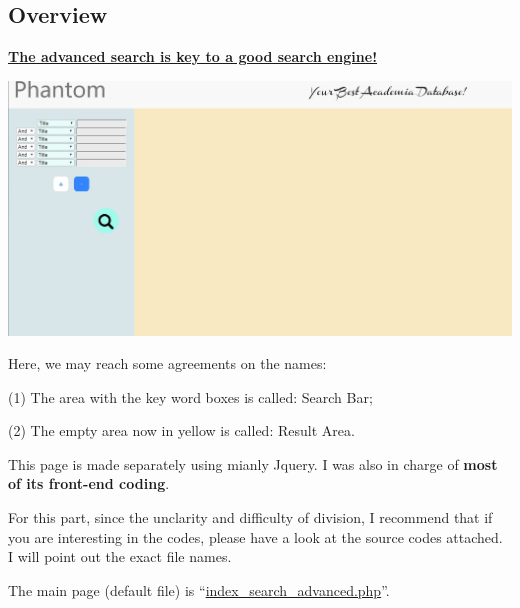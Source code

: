 \documentclass[10pt,twoside,a4paper,titlepage]{article}
\begin{document}
	\subsection{Overview}
		\begin{large}\underline{\textbf{The advanced search is key to a good search engine!}}\end{large}\newline\par
		\includegraphics[width=1\textwidth]{gzl/14.jpg}\newline\par
		Here, we may reach some agreements on the names:\par
		\indent\indent(1) The area with the key word boxes is called: Search Bar;\par
		\indent\indent(2) The empty area now in yellow is called: Result Area.\par
		This page is made separately using mianly Jquery. I was also in charge of \textbf{most of its front-end coding}.\par
		For this part, since the unclarity and difficulty of division, I recommend that if you are interesting in the codes, please have a look at the source codes attached. I will point out the exact file names.\par
		The main page (default file) is “\underline{index\_search\_advanced.php}”.
\end{document}
